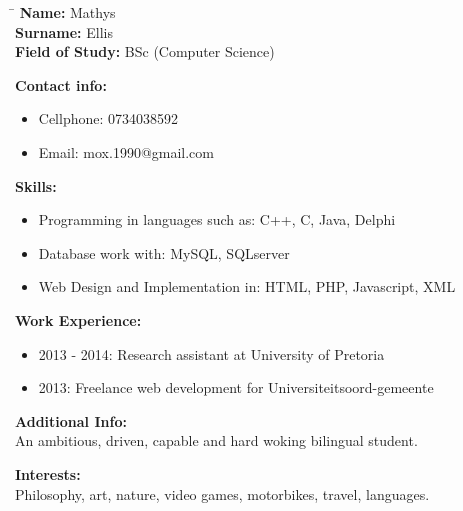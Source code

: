 \documentclass[12pt]{article}
\begin{document}
	\begin{flushleft}
		\begin{tabbing}
			\hspace*{4cm}\=\hspace*{3cm}\kill
			\textbf{Name:} \> Mathys \\	
			\textbf{Surname:} \> Ellis \\
			\textbf{Field of Study:} \> BSc (Computer Science)
		\end{tabbing}
		
		\textbf{Contact info:}	
		\begin{itemize}
			\item Cellphone: 0734038592
			\item Email: mox.1990@gmail.com
		\end{itemize}
		
	
	
		\textbf{Skills:}
		\begin{itemize}
			\item Programming in languages such as: C++, C, Java, Delphi
			\item Database work with: MySQL, SQLserver
			\item Web Design and Implementation in: HTML, PHP, Javascript, XML
		\end{itemize}
	
		\textbf{Work Experience:}
		\begin{itemize}
			\item 2013 - 2014: Research assistant at University of Pretoria
			\item 2013: Freelance web development for Universiteitsoord-gemeente 
		\end{itemize}
	
		\textbf{Additional Info:} \\
		\vspace{0.1in}
	 	An ambitious, driven, capable and hard woking bilingual student. \\
		\vspace{0.1in}
		
		\textbf{Interests:} \\
		\vspace{0.1in}
	 	Philosophy, art, nature, video games, motorbikes, travel, languages. \\
	 	\vspace{0.1in}
	\end{flushleft}
\end{document}

